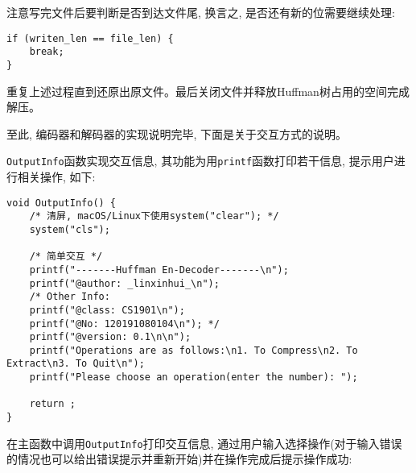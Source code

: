 \documentclass[a4paper]{ctexart}
\begin{document}
注意写完文件后要判断是否到达文件尾, 换言之, 是否还有新的位需要继续处理:

{\setmainfont{Courier New Bold}              
\begin{lstlisting}
if (writen_len == file_len) {
    break;
}
\end{lstlisting}}

重复上述过程直到还原出原文件。最后关闭文件并释放Huffman树占用的空间完成解压。

至此, 编码器和解码器的实现说明完毕, 下面是关于交互方式的说明。

\texttt{OutputInfo}函数实现交互信息, 其功能为用\texttt{printf}函数打印若干信息, 提示用户进行相关操作, 如下:

{\setmainfont{Courier New Bold}              
\begin{lstlisting}
void OutputInfo() {
    /* 清屏, macOS/Linux下使用system("clear"); */
    system("cls");

    /* 简单交互 */
    printf("-------Huffman En-Decoder-------\n");
    printf("@author: _linxinhui_\n");
    /* Other Info:
    printf("@class: CS1901\n");
    printf("@No: 120191080104\n"); */
    printf("@version: 0.1\n\n");
    printf("Operations are as follows:\n1. To Compress\n2. To Extract\n3. To Quit\n");
    printf("Please choose an operation(enter the number): ");

    return ;
}
\end{lstlisting}}

在主函数中调用\texttt{OutputInfo}打印交互信息, 通过用户输入选择操作(对于输入错误的情况也可以给出错误提示并重新开始)并在操作完成后提示操作成功:
\end{document}
